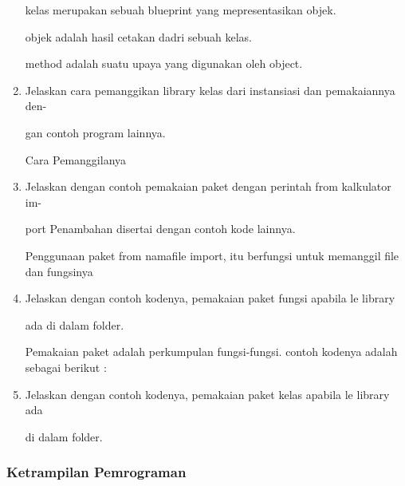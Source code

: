 \begin{enumerate}
    kelas merupakan sebuah blueprint yang mepresentasikan objek.

    objek adalah hasil cetakan dadri sebuah kelas.

    method adalah suatu upaya yang digunakan oleh object.

    



    \item Jelaskan cara pemanggikan library kelas dari instansiasi dan pemakaiannya den-

    gan contoh program lainnya.

    Cara Pemanggilanya 

    



    \item Jelaskan dengan contoh pemakaian paket dengan perintah from kalkulator im-

    port Penambahan disertai dengan contoh kode lainnya.

    Penggunaan paket from namafile import, itu berfungsi untuk memanggil file dan fungsinya

    



    \item Jelaskan dengan contoh kodenya, pemakaian paket fungsi apabila 
le library

    ada di dalam folder.

    Pemakaian paket adalah perkumpulan fungsi-fungsi. contoh kodenya adalah sebagai berikut :



    \item Jelaskan dengan contoh kodenya, pemakaian paket kelas apabila 
le library ada

    di dalam folder.

    



\end{enumerate}

\subsubsection{Ketrampilan Pemrograman}

